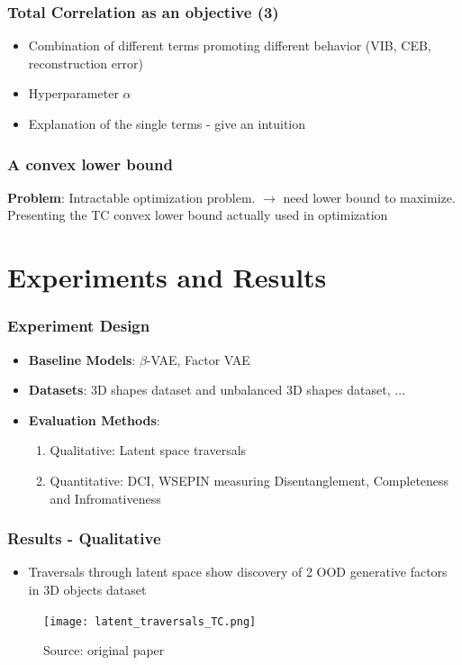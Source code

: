 \documentclass{beamer}
\theoremstyle{definition}
\begin{document}
    \begin{frame}
      \frametitle{Total Correlation as an objective (3)}
      \begin{itemize}
        \item Combination of different terms promoting different behavior (VIB, CEB, reconstruction error)
        \item Hyperparameter $\alpha$
        \item Explanation of the single terms - give an intuition
      \end{itemize}
    \end{frame}
    \begin{frame}
      \frametitle{A convex lower bound}
      \textbf{Problem}: Intractable optimization problem. $\to$ need lower bound to maximize.
      Presenting the TC convex lower bound actually used in optimization
    \end{frame}


  \section{Experiments and Results}
    \begin{frame}
      \frametitle{Experiment Design}
      \begin{itemize}
        \item \textbf{Baseline Models}: $\beta$-VAE, Factor VAE
        \item \textbf{Datasets}: 3D shapes dataset and unbalanced 3D shapes dataset, $\dots$
        \item \textbf{Evaluation Methods}:
          \begin{enumerate}
            \item Qualitative: Latent space traversals
            \item Quantitative: DCI, WSEPIN measuring Disentanglement, Completeness and Infromativeness
          \end{enumerate}
      \end{itemize}
    \end{frame}

    \begin{frame}
      \frametitle{Results - Qualitative}
      \begin{itemize}
        \item Traversals through latent space show discovery of 2 OOD generative factors in 3D objects dataset
      \end{itemize}
      \begin{figure}
        \centering
        \texttt{[image: latent\_traversals\_TC.png]}
        \captionsetup{justification=centering}
        \caption*{\tiny{Source: original paper}}

      \end{figure}
    \end{frame}
\end{document}
